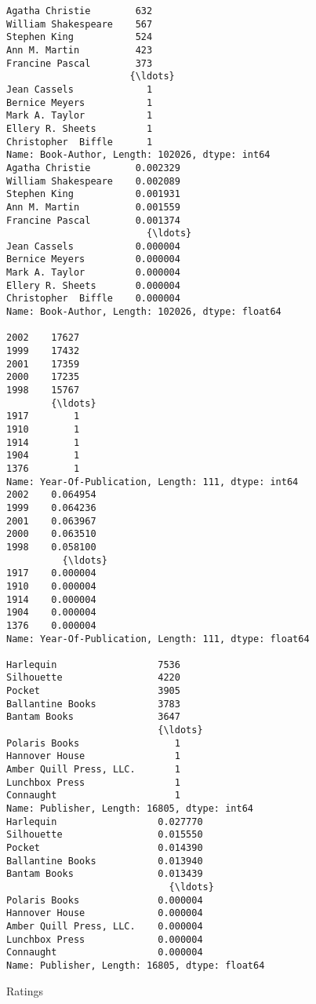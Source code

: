\documentclass[11pt]{article}
\begin{document}
    \begin{Verbatim}[commandchars=\\\{\}]
Agatha Christie        632
William Shakespeare    567
Stephen King           524
Ann M. Martin          423
Francine Pascal        373
                      {\ldots}
Jean Cassels             1
Bernice Meyers           1
Mark A. Taylor           1
Ellery R. Sheets         1
Christopher  Biffle      1
Name: Book-Author, Length: 102026, dtype: int64
Agatha Christie        0.002329
William Shakespeare    0.002089
Stephen King           0.001931
Ann M. Martin          0.001559
Francine Pascal        0.001374
                         {\ldots}
Jean Cassels           0.000004
Bernice Meyers         0.000004
Mark A. Taylor         0.000004
Ellery R. Sheets       0.000004
Christopher  Biffle    0.000004
Name: Book-Author, Length: 102026, dtype: float64

2002    17627
1999    17432
2001    17359
2000    17235
1998    15767
        {\ldots}
1917        1
1910        1
1914        1
1904        1
1376        1
Name: Year-Of-Publication, Length: 111, dtype: int64
2002    0.064954
1999    0.064236
2001    0.063967
2000    0.063510
1998    0.058100
          {\ldots}
1917    0.000004
1910    0.000004
1914    0.000004
1904    0.000004
1376    0.000004
Name: Year-Of-Publication, Length: 111, dtype: float64

Harlequin                  7536
Silhouette                 4220
Pocket                     3905
Ballantine Books           3783
Bantam Books               3647
                           {\ldots}
Polaris Books                 1
Hannover House                1
Amber Quill Press, LLC.       1
Lunchbox Press                1
Connaught                     1
Name: Publisher, Length: 16805, dtype: int64
Harlequin                  0.027770
Silhouette                 0.015550
Pocket                     0.014390
Ballantine Books           0.013940
Bantam Books               0.013439
                             {\ldots}
Polaris Books              0.000004
Hannover House             0.000004
Amber Quill Press, LLC.    0.000004
Lunchbox Press             0.000004
Connaught                  0.000004
Name: Publisher, Length: 16805, dtype: float64

    \end{Verbatim}

    Ratings
\end{document}
